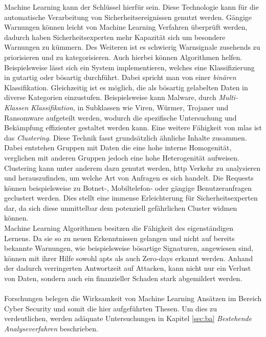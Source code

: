 \documentclass[
    12pt, %
    DIV10,
    ngerman, %
    a4paper, %
    oneside, %
    titlepage, %
    parskip=half, %
    headings=normal, %
    listof=totoc, %
    bibliography=totoc, %
    index=totoc, %
    captions=tableheading, %
    final %
]{scrreprt}
\begin{document}
Machine Learning kann der Schlüssel hierfür sein. Diese Technologie kann für die automatische Verarbeitung von Sicherheitsereignissen genutzt werden. Gängige Warnungen können leicht von Machine Learning Verfahren überprüft werden, dadurch haben Sicherheitsexperten mehr Kapazität sich um besondere Warnungen zu kümmern. Des Weiteren ist es schwierig Warnsignale zusehends zu priorisieren und zu kategorisieren. Auch hierbei können Algorithmen helfen. Beispielsweise lässt sich ein System implementieren, welches eine Klassifizierung in gutartig oder bösartig durchführt. Dabei spricht man von einer \emph{binären} Klassifikation. Gleichzeitig ist es möglich, die als bösartig gelabelten Daten in diverse Kategorien einzustufen. Beispielsweise kann Malware, durch \emph{Multi-Klassen Klassifikation}, in Subklassen wie Viren, Würmer, Trojaner und Ransomware aufgeteilt werden, wodurch die spezifische Untersuchung und Bekämpfung effizienter gestaltet werden kann.  Eine weitere Fähigkeit von \ac{mlas} ist das \emph{Clustering}. Diese Technik fasst grundsätzlich ähnliche Inhalte zusammen. Dabei entstehen Gruppen mit Daten die eine hohe interne Homogenität, verglichen mit anderen Gruppen jedoch eine hohe Heterogenität aufweisen. Clustering kann unter anderem dazu genutzt werden, \ac{http} Verkehr zu analysieren und herauszufinden, um welche Art von Anfragen es sich handelt. Die Requests können beispielsweise zu Botnet-, Mobiltelefon- oder gängige Benutzeranfragen geclustert werden. Dies stellt eine immense Erleichterung für Sicherheitsexperten dar, da sich diese unmittelbar dem potenziell gefährlichen Cluster widmen können. \\Machine Learning Algorithmen besitzen die Fähigkeit des eigenständigen Lernens. Da sie so zu neuen Erkenntnissen gelangen und nicht auf bereits bekannte Warnungen, wie beispielsweise bösartige Signaturen, angewiesen sind, können mit ihrer Hilfe sowohl \ac{apts} als auch Zero-days erkannt werden. Anhand der dadurch verringerten Antwortzeit auf Attacken, kann nicht nur ein Verlust von Daten, sondern auch ein finanzieller Schaden stark abgemildert werden.
\\\\
Forschungen belegen die Wirksamkeit von Machine Learning Ansätzen im Bereich Cyber Security und somit die hier aufgeführten Thesen. Um dies zu verdeutlichen, werden adäquate Untersuchungen in Kapitel \ref{sec:ba} \emph{Bestehende Analyseverfahren} beschrieben.
\end{document}
